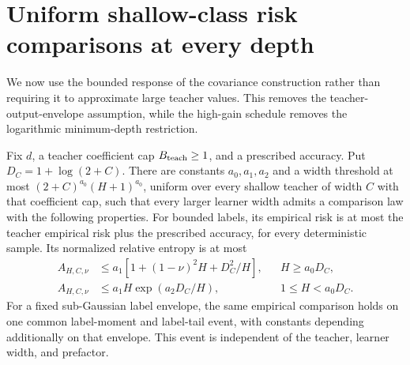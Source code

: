 \section{Uniform shallow-class risk comparisons at every depth}
\label{sec:uniform-risk-comparison}
We now use the bounded response of the covariance construction rather than requiring it to approximate large teacher values. This removes the teacher-output-envelope assumption, while the high-gain schedule removes the logarithmic minimum-depth restriction.

\begin{proposition}
\label{prop:uniform-risk-comparison}
Fix $d$, a teacher coefficient cap $B_{\rm teach}\ge1$, and a prescribed accuracy. Put $D_C=1+\log(2+C)$. There are constants $a_0,a_1,a_2$ and a width threshold at most
$(2+C)^{a_0}(H+1)^{a_0}$, uniform over every shallow teacher of width $C$ with that coefficient cap, such that every larger learner width admits a comparison law with the following properties.
For bounded labels, its empirical risk is at most the teacher empirical risk plus the prescribed accuracy, for every deterministic sample. Its normalized relative entropy is at most
\begin{align}
 A_{H,C,\nu}&\le a_1[1+(1-\nu)^2H+D_C^2/H],
     &&H\ge a_0D_C,\label{eq:risk-action-large-depth}\\
 A_{H,C,\nu}&\le a_1H\exp(a_2D_C/H),
     &&1\le H<a_0D_C.\label{eq:risk-action-small-depth}
\end{align}
For a fixed sub-Gaussian label envelope, the same empirical comparison holds on one common label-moment and label-tail event, with constants depending additionally on that envelope. This event is independent of the teacher, learner width, and prefactor.
\end{proposition}
